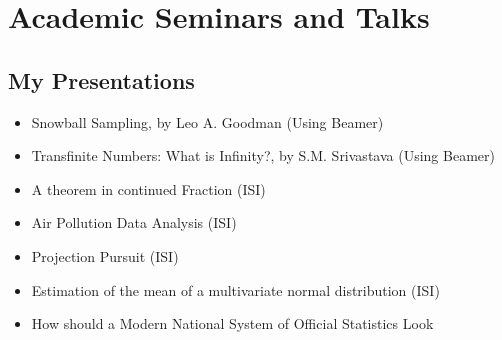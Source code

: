 \documentclass[11pt,a4paper]{article}
\begin{document}
\section{Academic Seminars and Talks}

\subsection{My Presentations}
\begin{itemize}[leftmargin=*]
  \item Snowball Sampling, by Leo A. Goodman (Using Beamer)
  \item Transfinite Numbers: What is Infinity?, by S.M. Srivastava (Using Beamer)
  \item A theorem in continued Fraction (ISI)
  \item Air Pollution Data Analysis (ISI)
  \item Projection Pursuit (ISI)
  \item Estimation of the mean of a multivariate normal distribution (ISI)
  \item How should a Modern National System of Official Statistics Look
\end{itemize}
\end{document}
